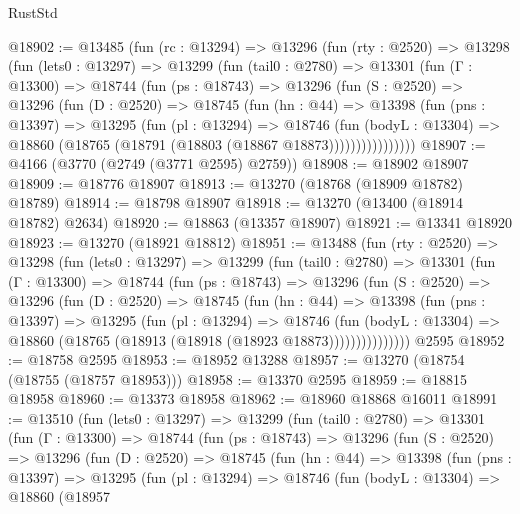\begin{lexlean}{RustStd}
\begin{coremodule}
@18902 := @13485
    (fun (rc : @13294) =>
    @13296
      (fun (rty : @2520) =>
      @13298
        (fun (lets0 : @13297) =>
        @13299
          (fun (tail0 : @2780) =>
          @13301
            (fun (Γ : @13300) =>
            @18744
              (fun (ps : @18743) =>
              @13296
                (fun (S : @2520) =>
                @13296
                  (fun (D : @2520) =>
                  @18745
                    (fun (hn : @44) =>
                    @13398
                      (fun (pns : @13397) =>
                      @13295
                        (fun (pl : @13294) =>
                        @18746
                          (fun (bodyL : @13304) =>
                          @18860 (@18765 (@18791 (@18803 (@18867 @18873))))))))))))))))
@18907 := @4166 (@3770 (@2749 (@3771 @2595) @2759))
@18908 := @18902 @18907
@18909 := @18776 @18907
@18913 := @13270 (@18768 (@18909 @18782) @18789)
@18914 := @18798 @18907
@18918 := @13270 (@13400 (@18914 @18782) @2634)
@18920 := @18863 (@13357 @18907)
@18921 := @13341 @18920
@18923 := @13270 (@18921 @18812)
@18951 := @13488
    (fun (rty : @2520) =>
    @13298
      (fun (lets0 : @13297) =>
      @13299
        (fun (tail0 : @2780) =>
        @13301
          (fun (Γ : @13300) =>
          @18744
            (fun (ps : @18743) =>
            @13296
              (fun (S : @2520) =>
              @13296
                (fun (D : @2520) =>
                @18745
                  (fun (hn : @44) =>
                  @13398
                    (fun (pns : @13397) =>
                    @13295
                      (fun (pl : @13294) =>
                      @18746
                        (fun (bodyL : @13304) =>
                        @18860 (@18765 (@18913 (@18918 (@18923 @18873)))))))))))))))
    @2595
@18952 := @18758 @2595
@18953 := @18952 @13288
@18957 := @13270 (@18754 (@18755 (@18757 @18953)))
@18958 := @13370 @2595
@18959 := @18815 @18958
@18960 := @13373 @18958
@18962 := @18960 @18868 @16011
@18991 := @13510
    (fun (lets0 : @13297) =>
    @13299
      (fun (tail0 : @2780) =>
      @13301
        (fun (Γ : @13300) =>
        @18744
          (fun (ps : @18743) =>
          @13296
            (fun (S : @2520) =>
            @13296
              (fun (D : @2520) =>
              @18745
                (fun (hn : @44) =>
                @13398
                  (fun (pns : @13397) =>
                  @13295
                    (fun (pl : @13294) =>
                    @18746
                      (fun (bodyL : @13304) =>
                      @18860
                        (@18957

\end{coremodule}
\end{lexlean}
